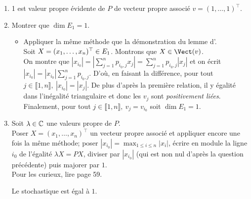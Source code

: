 \begin{solution}
    \begin{enumerate}
        \item 1 est valeur propre évidente de $P$ de vecteur propre associé $v = (1, \dots, 1)^\top$.
        \item Montrer que $\dim E_1 = 1$.
        \begin{itemize}
            \item Appliquer la même méthode que la démonstration du lemme d'. \\
            Soit $X = (x_1, \dots, x_n)^\top \in E_1$. Montrons que $X \in \Vect(v)$. \\
            On montre que $|x_{i_0}| = \left| \sum\limits_{j=1}^{n} p_{i_0, j} x_j \right| = \sum\limits_{j=1}^{n} p_{i_0, j} |x_j|$ et on écrit $|x_{i_0}| = |x_{i_0}| \sum\limits_{j=1}^{n} p_{i_0, j}$. D'où, en faisant la différence, pour tout $j \in \llbracket 1, n \rrbracket,\ |x_{i_0}| = |x_j|$. De plus d'après la première relation, il y égalité dans l'inégalité triangulaire et donc les $v_j$ sont \emph{positivement liées}. Finalement, pour tout $j \in \llbracket1, n \rrbracket,\ v_j = v_{i_0}$ soit $\dim E_1 = 1$.
        \end{itemize}
        \item Soit $\lambda \in \mathbb{C}$ une valeurs propre de $P$. \\
        Poser $X = (x_1, \dots, x_n)^\top$ un vecteur propre associé et appliquer encore une fois la même méthode; poser $\displaystyle |x_{i_0}|= \max_{1 \leqslant i \leqslant n} |x_i|$, écrire en module la ligne $i_0$ de l'égalité $\lambda X = P X$, diviser par $|x_{i_0}|$ (qui est non nul d'après la question précédente) puis majorer par $1$. \\
            
        Pour les curieux, lire \cite{matrices} page 59. 
        
        \begin{prop}
            Le  stochastique est égal à $1$.
        \end{prop}
    

\end{enumerate}
\end{solution}
